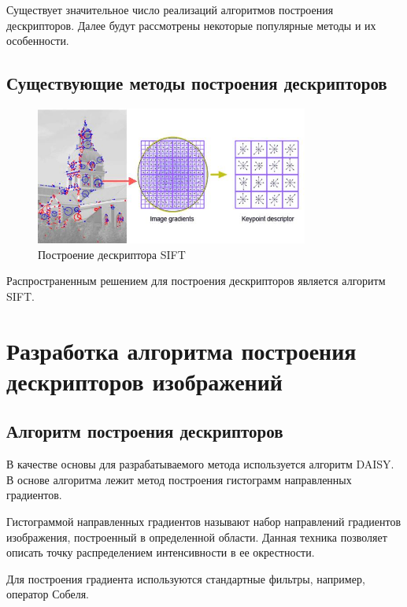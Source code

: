 {{	Существует значительное число реализаций алгоритмов построения дескрипторов. Далее будут рассмотрены некоторые популярные методы и их особенности.
	
\newpage
\subsection{Существующие методы построения дескрипторов}{
	
	\begin{figure}[H]
		\centering                             
		\includegraphics[width=0.8\textwidth,keepaspectratio]{daisy/SIFT.jpg}       
		\centering\caption{ Построение дескриптора SIFT }
		\label{gradient_example}                           
	\end{figure}    
	
	Распространенным решением для построения дескрипторов является алгоритм SIFT. 
	
}

\newpage

\section{Разработка алгоритма построения дескрипторов изображений}
{
	\subsection{Алгоритм построения дескрипторов}
	{
		В качестве основы для разрабатываемого метода используется алгоритм DAISY.
		В основе алгоритма лежит метод построения гистограмм направленных градиентов. 
		
		Гистограммой направленных градиентов называют набор направлений градиентов изображения, построенный в определенной области. Данная техника позволяет описать точку распределением интенсивности в ее окрестности.
		
		Для построения градиента используются стандартные фильтры, например, оператор Собеля. 
		
}}}}
